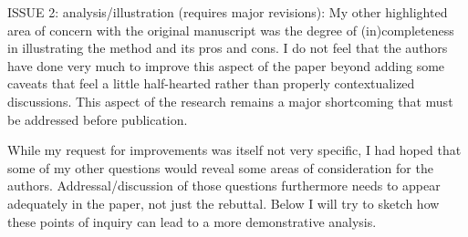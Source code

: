 \documentclass[11pt]{article}
\begin{document}
\begin{itshape}
ISSUE 2: analysis/illustration (requires major revisions): 
My other highlighted area of concern with the original manuscript was the degree of (in)completeness in illustrating the method and its pros and cons.  I do not feel that the authors have done very much to improve this aspect of the paper beyond adding some caveats that feel a little half-hearted rather than properly contextualized discussions.  This aspect of the research remains a major shortcoming that must be addressed before publication.  

While my request for improvements was itself not very specific, I had hoped that some of my other questions would reveal some areas of consideration for the authors.  Addressal/discussion of those questions furthermore needs to appear adequately in the paper, not just the rebuttal. Below I will try to sketch how these points of inquiry can lead to a more demonstrative analysis.

\end{itshape}
\end{document}
